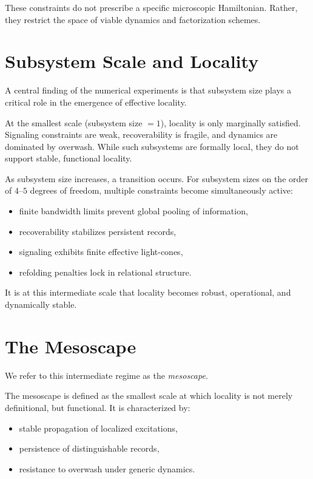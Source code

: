 \documentclass[11pt]{article}
\begin{document}
These constraints do not prescribe a specific microscopic Hamiltonian. Rather, they restrict the space of viable dynamics and factorization schemes.

\section{Subsystem Scale and Locality}

A central finding of the numerical experiments is that subsystem size plays a critical role in the emergence of effective locality.

At the smallest scale (subsystem size $=1$), locality is only marginally satisfied. Signaling constraints are weak, recoverability is fragile, and dynamics are dominated by overwash. While such subsystems are formally local, they do not support stable, functional locality.

As subsystem size increases, a transition occurs. For subsystem sizes on the order of $4$--$5$ degrees of freedom, multiple constraints become simultaneously active:
\begin{itemize}
    \item finite bandwidth limits prevent global pooling of information,
    \item recoverability stabilizes persistent records,
    \item signaling exhibits finite effective light-cones,
    \item refolding penalties lock in relational structure.
\end{itemize}

It is at this intermediate scale that locality becomes robust, operational, and dynamically stable.

\section{The Mesoscape}

We refer to this intermediate regime as the \emph{mesoscape}.

The mesoscape is defined as the smallest scale at which locality is not merely definitional, but functional. It is characterized by:
\begin{itemize}
    \item stable propagation of localized excitations,
    \item persistence of distinguishable records,
    \item resistance to overwash under generic dynamics.
\end{itemize}
\end{document}
